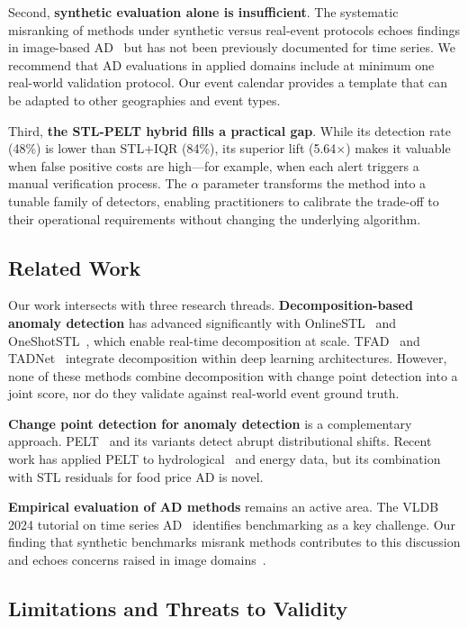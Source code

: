 \documentclass[10pt]{article}
\begin{document}
Second, \textbf{synthetic evaluation alone is insufficient}. The systematic misranking of methods under synthetic versus real-event protocols echoes findings in image-based AD~\cite{swsa2023} but has not been previously documented for time series. We recommend that AD evaluations in applied domains include at minimum one real-world validation protocol. Our event calendar provides a template that can be adapted to other geographies and event types.

Third, \textbf{the STL-PELT hybrid fills a practical gap}. While its detection rate (48\%) is lower than STL+IQR (84\%), its superior lift (5.64$\times$) makes it valuable when false positive costs are high---for example, when each alert triggers a manual verification process. The $\alpha$ parameter transforms the method into a tunable family of detectors, enabling practitioners to calibrate the trade-off to their operational requirements without changing the underlying algorithm.

\subsection{Related Work}

Our work intersects with three research threads. \textbf{Decomposition-based anomaly detection} has advanced significantly with OnlineSTL~\cite{mishra2022onlinestl} and OneShotSTL~\cite{he2023oneshotstl}, which enable real-time decomposition at scale. TFAD~\cite{zhang2022tfad} and TADNet~\cite{tadnet2023} integrate decomposition within deep learning architectures. However, none of these methods combine decomposition with change point detection into a joint score, nor do they validate against real-world event ground truth.

\textbf{Change point detection for anomaly detection} is a complementary approach. PELT~\cite{killick2012pelt} and its variants detect abrupt distributional shifts. Recent work has applied PELT to hydrological~\cite{herho2022pelt} and energy data, but its combination with STL residuals for food price AD is novel.

\textbf{Empirical evaluation of AD methods} remains an active area. The VLDB 2024 tutorial on time series AD~\cite{liu2024overview} identifies benchmarking as a key challenge. Our finding that synthetic benchmarks misrank methods contributes to this discussion and echoes concerns raised in image domains~\cite{swsa2023}.

\subsection{Limitations and Threats to Validity}
\end{document}
